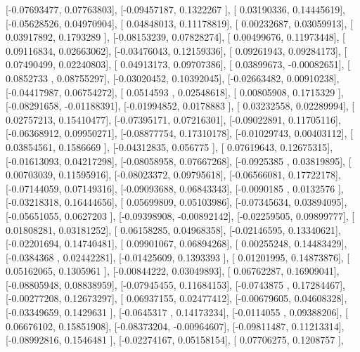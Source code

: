 \documentclass{article}
\begin{document}
       [-0.07693477,  0.07763803],
       [-0.09457187,  0.1322267 ],
       [ 0.03190336,  0.14445619],
       [-0.05628526,  0.04970904],
       [ 0.04848013,  0.11178819],
       [ 0.00232687,  0.03059913],
       [ 0.03917892,  0.1793289 ],
       [-0.08153239,  0.07828274],
       [ 0.00499676,  0.11973448],
       [ 0.09116834,  0.02663062],
       [-0.03476043,  0.12159336],
       [ 0.09261943,  0.09284173],
       [ 0.07490499,  0.02240803],
       [ 0.04913173,  0.09707386],
       [ 0.03899673, -0.00082651],
       [ 0.0852733 ,  0.08755297],
       [-0.03020452,  0.10392045],
       [-0.02663482,  0.00910238],
       [-0.04417987,  0.06754272],
       [ 0.0514593 ,  0.02548618],
       [ 0.00805908,  0.1715329 ],
       [-0.08291658, -0.01188391],
       [-0.01994852,  0.0178883 ],
       [ 0.03232558,  0.02289994],
       [ 0.02757213,  0.15410477],
       [-0.07395171,  0.07216301],
       [-0.09022891,  0.11705116],
       [-0.06368912,  0.09950271],
       [-0.08877754,  0.17310178],
       [-0.01029743,  0.00403112],
       [ 0.03854561,  0.1586669 ],
       [-0.04312835,  0.056775  ],
       [ 0.07619643,  0.12675315],
       [-0.01613093,  0.04217298],
       [-0.08058958,  0.07667268],
       [-0.0925385 ,  0.03819895],
       [ 0.00703039,  0.11595916],
       [-0.08023372,  0.09795618],
       [-0.06566081,  0.17722178],
       [-0.07144059,  0.07149316],
       [-0.09093688,  0.06843343],
       [-0.0090185 ,  0.0132576 ],
       [-0.03218318,  0.16444656],
       [ 0.05699809,  0.05103986],
       [-0.07345634,  0.03894095],
       [-0.05651055,  0.0627203 ],
       [-0.09398908, -0.00892142],
       [-0.02259505,  0.09899777],
       [ 0.01808281,  0.03181252],
       [ 0.06158285,  0.04968358],
       [-0.02146595,  0.13340621],
       [-0.02201694,  0.14740481],
       [ 0.09901067,  0.06894268],
       [ 0.00255248,  0.14483429],
       [-0.0384368 ,  0.02442281],
       [-0.01425609,  0.1393393 ],
       [ 0.01201995,  0.14873876],
       [ 0.05162065,  0.1305961 ],
       [-0.00844222,  0.03049893],
       [ 0.06762287,  0.16909041],
       [-0.08805948,  0.08838959],
       [-0.07945455,  0.11684153],
       [-0.0743875 ,  0.17284467],
       [-0.00277208,  0.12673297],
       [ 0.06937155,  0.02477412],
       [-0.00679605,  0.04608328],
       [-0.03349659,  0.1429631 ],
       [-0.0645317 ,  0.14173234],
       [-0.0114055 ,  0.09388206],
       [ 0.06676102,  0.15851908],
       [-0.08373204, -0.00964607],
       [-0.09811487,  0.11213314],
       [-0.08992816,  0.1546481 ],
       [-0.02274167,  0.05158154],
       [ 0.07706275,  0.1208757 ],
\end{document}
